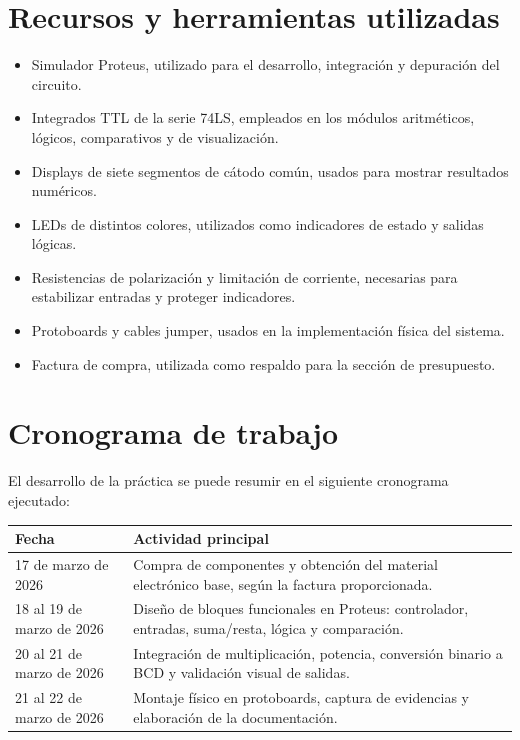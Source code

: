 \documentclass[12pt,a4paper]{article}
\begin{document}
\section{Recursos y herramientas utilizadas}
\begin{itemize}[leftmargin=1.2cm]
    \item Simulador Proteus, utilizado para el desarrollo, integración y depuración del circuito.
    \item Integrados TTL de la serie 74LS, empleados en los módulos aritméticos, lógicos, comparativos y de visualización.
    \item Displays de siete segmentos de cátodo común, usados para mostrar resultados numéricos.
    \item LEDs de distintos colores, utilizados como indicadores de estado y salidas lógicas.
    \item Resistencias de polarización y limitación de corriente, necesarias para estabilizar entradas y proteger indicadores.
    \item Protoboards y cables jumper, usados en la implementación física del sistema.
    \item Factura de compra, utilizada como respaldo para la sección de presupuesto.
\end{itemize}

\section{Cronograma de trabajo}
El desarrollo de la práctica se puede resumir en el siguiente cronograma ejecutado:

\begin{longtable}{p{3.5cm}p{11cm}}
\toprule
\textbf{Fecha} & \textbf{Actividad principal} \\
\midrule
17 de marzo de 2026 & Compra de componentes y obtención del material electrónico base, según la factura proporcionada. \\
18 al 19 de marzo de 2026 & Diseño de bloques funcionales en Proteus: controlador, entradas, suma/resta, lógica y comparación. \\
20 al 21 de marzo de 2026 & Integración de multiplicación, potencia, conversión binario a BCD y validación visual de salidas. \\
21 al 22 de marzo de 2026 & Montaje físico en protoboards, captura de evidencias y elaboración de la documentación. \\
\bottomrule
\end{longtable}
\end{document}

